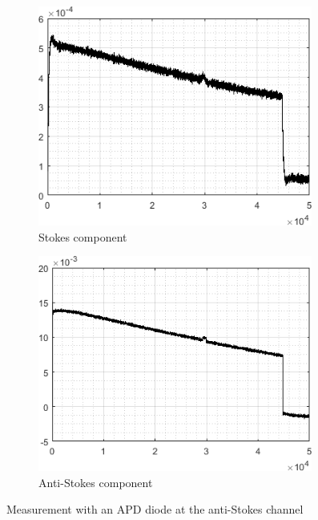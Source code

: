 \documentclass{standalone}
\begin{document}
\begin{figure}[h]
	\begin{subfigure}[b]{0.49\textwidth}
		\flushleft
		\includegraphics[width=0.99\textwidth]{apd_scattering_stokes}
		\caption{Stokes component}
	\end{subfigure}
	\begin{subfigure}[b]{0.49\textwidth}
		\flushright
		\includegraphics[width=0.99\textwidth]{apd_scattering_antistokes.png}
		\caption{Anti-Stokes component}
	\end{subfigure}
	\caption{Measurement with an APD diode at the anti-Stokes channel}
	\label{fig:apd_scattering}
\end{figure}
\end{document}
